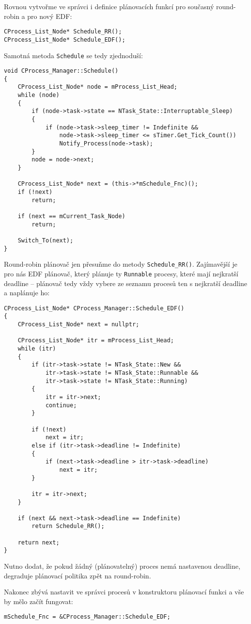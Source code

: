 \documentclass{article}
\begin{document}
Rovnou vytvořme ve správci i definice plánovacích funkcí pro současný round-robin a pro nový EDF:
\begin{lstlisting}
CProcess_List_Node* Schedule_RR();
CProcess_List_Node* Schedule_EDF();
\end{lstlisting}

Samotná metoda \texttt{Schedule} se tedy zjednoduší:
\begin{lstlisting}
void CProcess_Manager::Schedule()
{
	CProcess_List_Node* node = mProcess_List_Head;
	while (node)
	{
		if (node->task->state == NTask_State::Interruptable_Sleep)
		{
			if (node->task->sleep_timer != Indefinite &&
			    node->task->sleep_timer <= sTimer.Get_Tick_Count())
				Notify_Process(node->task);
		}
		node = node->next;
	}

	CProcess_List_Node* next = (this->*mSchedule_Fnc)();
	if (!next)
		return;

	if (next == mCurrent_Task_Node)
		return;
	
	Switch_To(next);
}
\end{lstlisting}

Round-robin plánovač jen přesuňme do metody \texttt{Schedule\_RR()}. Zajímavější je pro nás EDF plánovač, který plánuje ty \texttt{Runnable} procesy, které mají nejkratší deadline -- plánovač tedy vždy vybere ze seznamu procesů ten s nejkratší deadline a naplánuje ho:
\begin{lstlisting}
CProcess_List_Node* CProcess_Manager::Schedule_EDF()
{
	CProcess_List_Node* next = nullptr;
	
	CProcess_List_Node* itr = mProcess_List_Head;
	while (itr)
	{
		if (itr->task->state != NTask_State::New &&
			itr->task->state != NTask_State::Runnable &&
			itr->task->state != NTask_State::Running)
		{
			itr = itr->next;
			continue;
		}

		if (!next)
			next = itr;
		else if (itr->task->deadline != Indefinite)
		{
			if (next->task->deadline > itr->task->deadline)
				next = itr;
		}
		
		itr = itr->next;
	}

	if (next && next->task->deadline == Indefinite)
		return Schedule_RR();
	
	return next;
}
\end{lstlisting}
Nutno dodat, že pokud žádný (plánovatelný) proces nemá nastavenou deadline, degraduje plánovací politika zpět na round-robin.

Nakonec zbývá nastavit ve správci procesů v konstruktoru plánovací funkci a vše by mělo začít fungovat:
\begin{lstlisting}
mSchedule_Fnc = &CProcess_Manager::Schedule_EDF;
\end{lstlisting}
\end{document}
